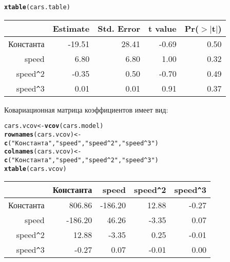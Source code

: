 \documentclass[pdftex,11pt,openany]{book}\usepackage[]{graphicx}\usepackage[]{color}
\makeatletter
\newcommand{\hlstr}[1]{\textcolor[rgb]{0.192,0.494,0.8}{#1}}%
\newcommand{\hlstd}[1]{\textcolor[rgb]{0.345,0.345,0.345}{#1}}%
\newcommand{\hlkwb}[1]{\textcolor[rgb]{0.69,0.353,0.396}{#1}}%
\newcommand{\hlkwd}[1]{\textcolor[rgb]{0.737,0.353,0.396}{\textbf{#1}}}%
\newenvironment{kframe}{%
 \def\at@end@of@kframe{}%
 \ifinner\ifhmode%
  \def\at@end@of@kframe{\end{minipage}}%
  \begin{minipage}{\columnwidth}%
 \fi\fi%
 \def\FrameCommand##1{\hskip\@totalleftmargin \hskip-\fboxsep
 \colorbox{shadecolor}{##1}\hskip-\fboxsep
     \hskip-\linewidth \hskip-\@totalleftmargin \hskip\columnwidth}%
 \MakeFramed {\advance\hsize-\width
   \@totalleftmargin\z@ \linewidth\hsize
   \@setminipage}}%
 {\par\unskip\endMakeFramed%
 \at@end@of@kframe}
\makeatother
\begin{document}
\begin{problem}
\begin{kframe}
\begin{alltt}
\hlkwd{xtable}\hlstd{(cars.table)}
\end{alltt}
\end{kframe}%
\begin{table}[ht]
\centering
\begin{tabular}{rrrrr}
  \hline
 & Estimate & Std. Error & t value & Pr($>$$|$t$|$) \\ 
  \hline
Константа & -19.51 & 28.41 & -0.69 & 0.50 \\ 
  speed & 6.80 & 6.80 & 1.00 & 0.32 \\ 
  speed\verb|^|2 & -0.35 & 0.50 & -0.70 & 0.49 \\ 
  speed\verb|^|3 & 0.01 & 0.01 & 0.91 & 0.37 \\ 
   \hline
\end{tabular}
\end{table}



Ковариационная матрица коэффициентов имеет вид:
\begin{kframe}
\begin{alltt}
\hlstd{cars.vcov} \hlkwb{<-} \hlkwd{vcov}\hlstd{(cars.model)}
\hlkwd{rownames}\hlstd{(cars.vcov)} \hlkwb{<-}
  \hlkwd{c}\hlstd{(}\hlstr{"Константа"}\hlstd{,}\hlstr{"speed"}\hlstd{,}\hlstr{"speed^2"}\hlstd{,}\hlstr{"speed^3"}\hlstd{)}
\hlkwd{colnames}\hlstd{(cars.vcov)} \hlkwb{<-}
  \hlkwd{c}\hlstd{(}\hlstr{"Константа"}\hlstd{,}\hlstr{"speed"}\hlstd{,}\hlstr{"speed^2"}\hlstd{,}\hlstr{"speed^3"}\hlstd{)}
\hlkwd{xtable}\hlstd{(cars.vcov)}
\end{alltt}
\end{kframe}%
\begin{table}[ht]
\centering
\begin{tabular}{rrrrr}
  \hline
 & Константа & speed & speed\verb|^|2 & speed\verb|^|3 \\ 
  \hline
Константа & 806.86 & -186.20 & 12.88 & -0.27 \\ 
  speed & -186.20 & 46.26 & -3.35 & 0.07 \\ 
  speed\verb|^|2 & 12.88 & -3.35 & 0.25 & -0.01 \\ 
  speed\verb|^|3 & -0.27 & 0.07 & -0.01 & 0.00 \\ 
   \hline
\end{tabular}
\end{table}




\end{problem}
\end{document}
